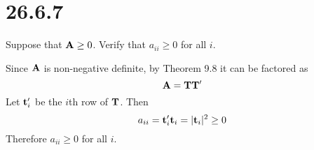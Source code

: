 \section*{26.6.7}
Suppose that ${\bf A}\ge 0$. Verify that $a_{ii}\ge0$ for all $i$.

\bigskip
\noindent
Since $\bf A$ is non-negative definite,
by Theorem 9.8 it can be factored as
$${\bf A}={\bf T}{\bf T}'$$
Let ${\bf t}_i'$ be the $i$th row of $\bf T$.
Then
$$a_{ii}={\bf t}_i'{\bf t}_i=|{\bf t}_i|^2\ge0$$
Therefore $a_{ii}\ge0$ for all $i$.
